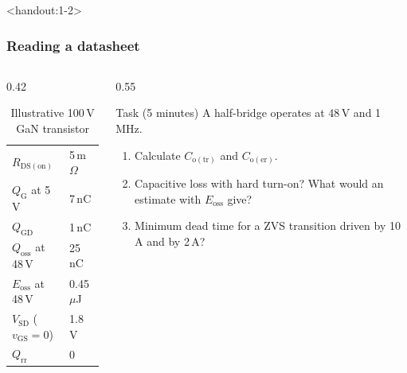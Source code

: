 \begin{frame}<handout:1-2>
	\frametitle{Reading a datasheet}
	\begin{columns}[T]
		\begin{column}{0.42\textwidth}
			\begin{table}
				\centering
				\small
				\begin{tabular}{|l|l|}
					\hline
					$R_\mathrm{DS(on)}$                & 5\,m$\Omega$     \\
					$Q_\mathrm{G}$ at 5\,V             & 7\,nC            \\
					$Q_\mathrm{GD}$                    & 1\,nC            \\
					$Q_\mathrm{oss}$ at 48\,V          & 25\,nC           \\
					$E_\mathrm{oss}$ at 48\,V          & 0.45\,$\mu$J     \\
					$V_\mathrm{SD}$ ($v_\mathrm{GS}=0$) & 1.8\,V          \\
					$Q_\mathrm{rr}$                    & 0                \\
					\hline
				\end{tabular}
				\caption{Illustrative 100\,V GaN transistor}
			\end{table}
		\end{column}
		\begin{column}{0.55\textwidth}
			\begin{block}{Task (5 minutes)}
				A half-bridge operates at 48\,V and 1\,MHz.
				\begin{enumerate}
					\item Calculate $C_\mathrm{o(tr)}$ and $C_\mathrm{o(er)}$.
					\item Capacitive loss with hard turn-on? What would an estimate with $E_\mathrm{oss}$ give?
					\item Minimum dead time for a ZVS transition driven by 10\,A and by 2\,A?
				\end{enumerate}
			\end{block}
		\end{column}
	\end{columns}
\end{frame}

